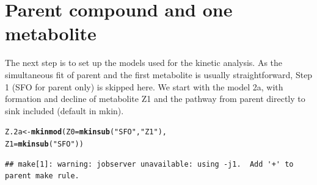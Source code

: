\documentclass[12pt,a4paper]{article}\usepackage[]{graphicx}\usepackage[]{color}
\makeatletter
\newcommand{\hlstr}[1]{\textcolor[rgb]{0.192,0.494,0.8}{#1}}%
\newcommand{\hlstd}[1]{\textcolor[rgb]{0.345,0.345,0.345}{#1}}%
\newcommand{\hlkwb}[1]{\textcolor[rgb]{0.69,0.353,0.396}{#1}}%
\newcommand{\hlkwc}[1]{\textcolor[rgb]{0.333,0.667,0.333}{#1}}%
\newcommand{\hlkwd}[1]{\textcolor[rgb]{0.737,0.353,0.396}{\textbf{#1}}}%
\newenvironment{kframe}{%
 \def\at@end@of@kframe{}%
 \ifinner\ifhmode%
  \def\at@end@of@kframe{\end{minipage}}%
  \begin{minipage}{\columnwidth}%
 \fi\fi%
 \def\FrameCommand##1{\hskip\@totalleftmargin \hskip-\fboxsep
 \colorbox{shadecolor}{##1}\hskip-\fboxsep
     \hskip-\linewidth \hskip-\@totalleftmargin \hskip\columnwidth}%
 \MakeFramed {\advance\hsize-\width
   \@totalleftmargin\z@ \linewidth\hsize
   \@setminipage}}%
 {\par\unskip\endMakeFramed%
 \at@end@of@kframe}
\newenvironment{knitrout}{}{} %
\makeatother
\begin{document}
\section{Parent compound and one metabolite}

The next step is to set up the models used for the kinetic analysis. As the 
simultaneous fit of parent and the first metabolite is usually straightforward,
Step 1 (SFO for parent only) is skipped here. We start with the model 2a, 
with formation and decline of metabolite Z1 and the pathway from parent
directly to sink included (default in mkin).

\begin{knitrout}
\color{fgcolor}\begin{kframe}
\begin{alltt}
\hlstd{Z.2a} \hlkwb{<-} \hlkwd{mkinmod}\hlstd{(}\hlkwc{Z0} \hlstd{=} \hlkwd{mkinsub}\hlstd{(}\hlstr{"SFO"}\hlstd{,} \hlstr{"Z1"}\hlstd{),}
                \hlkwc{Z1} \hlstd{=} \hlkwd{mkinsub}\hlstd{(}\hlstr{"SFO"}\hlstd{))}
\end{alltt}
\begin{verbatim}
## make[1]: warning: jobserver unavailable: using -j1.  Add '+' to parent make rule.
\end{verbatim}



\end{kframe}
\end{knitrout}
\end{document}
